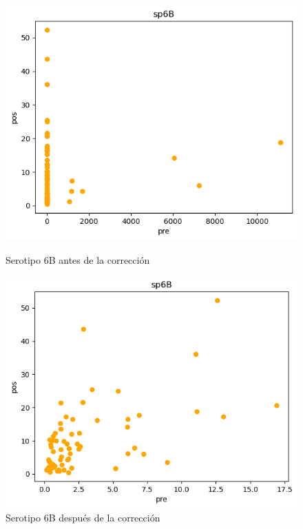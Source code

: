 \begin{figure}[h]
    \centering
    \begin{minipage}{0.45\textwidth}
        \centering
        \includegraphics[width=\linewidth]{Graphics/sp6bd.png}
        \caption{Serotipo 6B antes de la corrección}
        \label{fig:sp6bd}
    \end{minipage}%
    \hfill
    \begin{minipage}{0.45\textwidth}
        \centering
        \includegraphics[width=\linewidth]{Graphics/sp6bc.png}
        \caption{Serotipo 6B después de la corrección}
        \label{fig:sp6bc}
    \end{minipage}

\end{figure}

